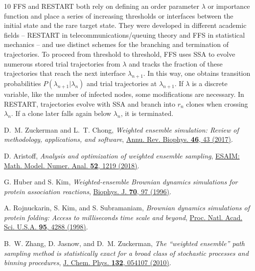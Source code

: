 \documentclass[english,10pt,aps,pra,twocolumn,superscriptaddress,floatfix,fleqn]{revtex4-2}
\begin{document}
\begin{thebibliography}{10}
FFS and RESTART both rely on defining an order parameter $\lambda $ or
  importance function and place a series of increasing thresholds or interfaces
  between the initial state and the rare target state. They were developed in
  different academic fields -- RESTART in telecommunications/queuing theory and
  FFS in statistical mechanics -- and use distinct schemes for the branching
  and termination of trajectories. To proceed from threshold to threshold, FFS
  uses SSA to evolve numerous stored trial trajectories from $\lambda $ and
  tracks the fraction of these trajectories that reach the next interface
  $\lambda _{n+1}$. In this way, one obtains transition probabilities
  $P(\lambda _{n+1}|\lambda _{n})$ and trial trajectories at $\lambda _{n+1}$.
  If $\lambda $ is a discrete variable, like the number of infected nodes, some
  modifications are necessary. In RESTART, trajectories evolve with SSA and
  branch into $r_n$ clones when crossing $\lambda _n$. If a clone later falls
  again below $\lambda _n$, it is terminated.

D.~M. Zuckerman and L.~T. Chong, {\em Weighted ensemble simulation: Review of
  methodology, applications, and software},
  \href{http://dx.doi.org/10.1146/annurev-biophys-070816-033834} {Annu. Rev.
  Biophys. {\bf 46},  43  (2017)}.

D. Aristoff, {\em Analysis and optimization of weighted ensemble sampling},
  \href{http://dx.doi.org/10.1051/m2an/2017046} {ESAIM: Math. Model. Numer.
  Anal. {\bf 52},  1219  (2018)}.

G. Huber and S. Kim, {\em Weighted-ensemble Brownian dynamics simulations for
  protein association reactions},
  \href{http://dx.doi.org/10.1016/s0006-3495(96)79552-8} {Biophys. J. {\bf 70},
   97  (1996)}.

A. Rojnuckarin, S. Kim, and S. Subramaniam, {\em Brownian dynamics simulations
  of protein folding: Access to milliseconds time scale and beyond},
  \href{http://dx.doi.org/10.1073/pnas.95.8.4288} {Proc. Natl. Acad. Sci.
  U.S.A. {\bf 95},  4288  (1998)}.

B.~W. Zhang, D. Jasnow, and D.~M. Zuckerman, {\em The ``weighted ensemble''
  path sampling method is statistically exact for a broad class of stochastic
  processes and binning procedures}, \href{http://dx.doi.org/10.1063/1.3306345}
  {J. Chem. Phys. {\bf 132},  054107  (2010)}.


\end{thebibliography}
\end{document}
